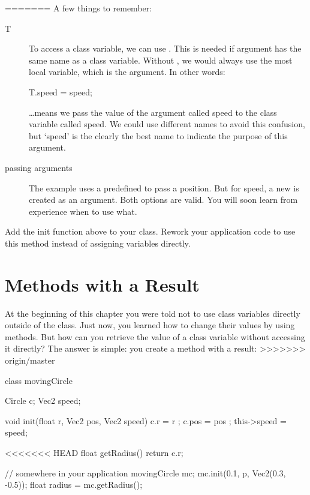 =======
A few things to remember:
\begin{description}
\item[T] To access a class variable, we can use . This is needed if argument has the same name as a class variable. Without , we would always use the most local variable, which is the argument. In other words:

\begin{code}
T.speed = speed;
\end{code}

\ldots means we pass the value of the argument called speed to the class variable called speed. We could use different names to avoid this confusion, but `speed' is the clearly the best name to indicate the purpose of this argument.

\item[passing arguments] The example uses a predefined  to pass a position. But for speed, a new  is created as an argument. Both options are valid. You will soon learn from experience when to use what.
\end{description}

\begin{exercise}
Add the init function above to your  class. Rework your application code to use this method instead of assigning variables directly.
\end{exercise}

\section{Methods with a Result}
At the beginning of this chapter you were told not to use class variables directly outside of the class. Just now, you learned how to change their values by using methods. But how can you retrieve the value of a class variable without accessing it directly? The answer is simple: you create a method with a result:
>>>>>>> origin/master

\begin{code}
class movingCircle {
  Circle c;
  Vec2 speed;
  
  void init(float r, Vec2 pos, Vec2 speed) {
    c.r         = r    ;
    c.pos       = pos  ;
    this->speed = speed;
  }
  
<<<<<<< HEAD
  float getRadius() {
    return c.r;
  }
}

// somewhere in your application
movingCircle mc;
mc.init(0.1, p, Vec2(0.3, -0.5));
float radius = mc.getRadius();

\end{code}

